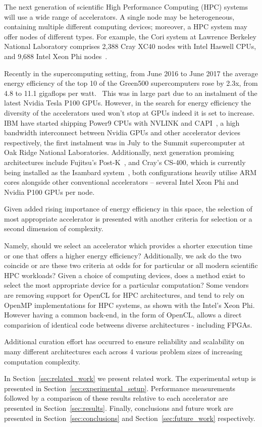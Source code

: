 \documentclass[../document.tex]{subfiles}
\begin{document}
\label{sec:introduction}

The next generation of scientific High Performance Computing (HPC) systems will use a wide range of accelerators.
A single node may be heterogeneous, containing multiple different computing devices; moreover, a HPC system may offer nodes of different types.
For example, the Cori system at Lawrence Berkeley National Laboratory comprises 2,388 Cray XC40 nodes with Intel Haswell CPUs, and 9,688 Intel Xeon Phi nodes~\cite{declerck2016cori}.


Recently in the supercomputing setting, from June 2016 to June 2017 the average energy efficiency of the top 10 of the Green500 supercomputers rose by 2.3x, from 4.8 to 11.1 gigaflops per watt.~\cite{feldman_2017}
This was in large part due to an instalment of the latest Nvidia Tesla P100 GPUs.
However, in the search for energy efficiency the diversity of the accelerators used won't stop at GPUs indeed it is set to increase.
IBM have started shipping Power9 CPUs with NVLINK and CAPI~\cite{morgan_2016}, a high bandwidth interconnect between Nvidia GPUs and other accelerator devices respectively, the first instalment was in July to the Summit supercomputer at Oak Ridge National Laboratories.\cite{morgan_2017}
Additionally, next generation promising architectures include Fujitsu's Post-K~\cite{morgan_2016_postk}, and Cray's CS-400, which is currently being installed as the Isambard system~\cite{feldman_2017_isambard}, both configurations heavily utilise ARM cores alongside other conventional accelerators -- several Intel Xeon Phi and Nvidia P100 GPUs per node.

Given added rising importance of energy efficiency in this space, the selection of most appropriate accelerator is presented with another criteria for selection or a second dimension of complexity.

Namely, should we select an accelerator which provides a shorter execution time or one that offers a higher energy efficiency?
Additionally, we ask do the two coincide or are these two criteria at odds for for particular or all modern scientific HPC workloads?
Given a choice of computing devices, does a method exist to select the most appropriate device for a particular computation?
Some vendors are removing support for OpenCL for HPC architectures, and tend to rely on OpenMP implementations for HPC systems, as shown with the Intel's Xeon Phi.
However having a common back-end, in the form of OpenCL, allows a direct comparision of identical code betweens diverse architectures - including FPGAs.

Additional curation effort has occurred to ensure reliability and scalability on many different architectures each across 4 various problem sizes of increasing computation complexity.

In Section~\ref{sec:related_work} we present related work.
The experimental setup is presented in Section~\ref{sec:experimental_setup}.
Performance measurements followed by a comparison of these results relative to each accelerator are presented in Section~\ref{sec:results}.
Finally, conclusions and future work are presented in Section~\ref{sec:conclusions} and Section~\ref{sec:future_work} respectively.
\end{document}
